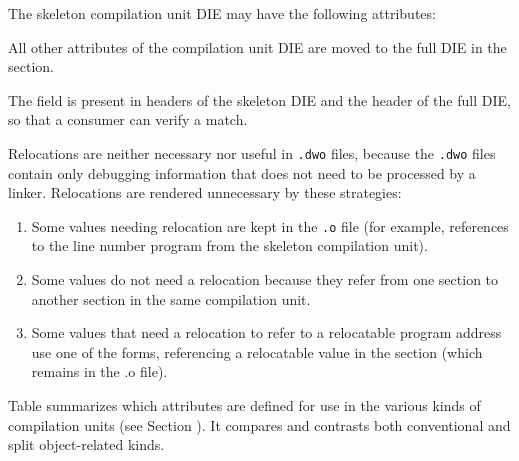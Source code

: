 The skeleton compilation unit DIE may have the following attributes:
\par
\begin{nolinenumbersenv}
\end{nolinenumbersenv}

All other attributes of the compilation unit DIE are moved to
the full DIE in the \dotdebuginfodwo{} section.

The \HFNdwoid{} field is present in headers of the skeleton DIE 
and the header of the full DIE, so that a consumer
can verify a match.

Relocations are neither necessary nor useful in 
\texttt{.dwo} files, because the \texttt{.dwo}  
files contain only debugging information that does not need to be
processed by a linker. Relocations are rendered unnecessary by 
these strategies:

\begin{enumerate}[1. ]
\item Some values needing relocation are kept in the \texttt{.o} file
(for example, references to the line number program from the skeleton
compilation unit).

\item Some values do not need a relocation because they refer from
one \dotdwo{} section to another \dotdwo{} section
in the same compilation unit. 

\item Some values that need a relocation to refer to a relocatable 
program address use one of the \DWFORMaddrxXNor{} forms, 
referencing a relocatable 
value in the \dotdebugaddr{} section (which remains in the .o file).

\end{enumerate}


Table  summarizes which
attributes are defined for use in the various 
kinds of compilation units (see Section ). 
It compares and contrasts both conventional and split object-related
kinds.

